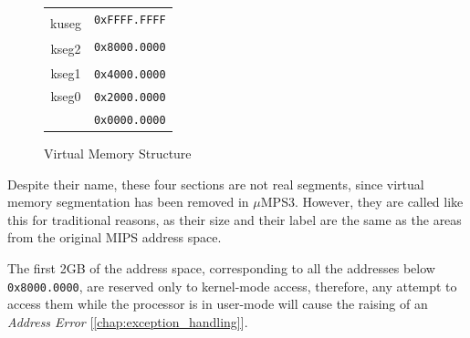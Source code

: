 \documentclass[12pt,a4paper,openright,twoside]{report}
\begin{document}
\begin{figure}[h]
	\centering
	\renewcommand{\arraystretch}{0.57}
	\begin{tabular}{cl}
		\multicolumn{1}{m{3cm}}{}                    & \multirow{2}{*}{\texttt{0xFFFF.FFFF}} \\ \cline{1-1}
		\multicolumn{1}{|c|}{\multirow{4}{*}{kuseg}} &                                       \\
		\multicolumn{1}{|c|}{}                       & \multirow{2}{*}{}                     \\
		\multicolumn{1}{|c|}{}                       &                                       \\
		\multicolumn{1}{|c|}{}                       & \multirow{2}{*}{\texttt{0x8000.0000}} \\ \cline{1-1}
		\multicolumn{1}{|c|}{\multirow{4}{*}{kseg2}} &                                       \\
		\multicolumn{1}{|c|}{}                       & \multirow{2}{*}{}                     \\
		\multicolumn{1}{|c|}{}                       &                                       \\
		\multicolumn{1}{|c|}{}                       & \multirow{2}{*}{\texttt{0x4000.0000}} \\ \cline{1-1}
		\multicolumn{1}{|c|}{\multirow{2}{*}{kseg1}} &                                       \\
		\multicolumn{1}{|c|}{}                       & \multirow{2}{*}{\texttt{0x2000.0000}} \\ \cline{1-1}
		\multicolumn{1}{|c|}{\multirow{2}{*}{kseg0}} &                                       \\
		\multicolumn{1}{|c|}{}                       & \multirow{2}{*}{\texttt{0x0000.0000}} \\ \cline{1-1}
		\multicolumn{1}{l}{}                         &
	\end{tabular}
	\caption{Virtual Memory Structure}
	\label{fig:virtual_memory}
\end{figure}
Despite their name, these four sections are not real segments, since virtual memory segmentation has been removed in $\mu$MPS3.
However, they are called like this for traditional reasons, as their size and their label are the same as the areas from the original MIPS address space.

The first 2GB of the address space, corresponding to all the addresses below \texttt{0x8000.0000}, are reserved only to kernel-mode access, therefore, any attempt to access them while the processor is in user-mode will cause the raising of an \textit{Address Error} [\autoref{chap:exception_handling}].
\end{document}

